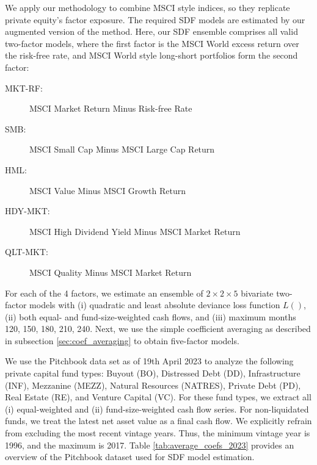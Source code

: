 \documentclass[12pt]{article}
\begin{document}
We apply our methodology to combine MSCI style indices, so they replicate private equity's factor exposure.
The required SDF models are estimated by our augmented version of the \cite{DLP12} method.
Here, our SDF ensemble comprises all valid two-factor models, where the first factor is the MSCI World excess return over the risk-free rate, and MSCI World style long-short portfolios form the second factor:
\begin{description}
	\item[MKT-RF:]{MSCI Market Return Minus Risk-free Rate}
	\item[SMB:]{MSCI Small Cap Minus MSCI Large Cap Return}
	\item[HML:]{MSCI Value Minus MSCI Growth Return}
	\item[HDY-MKT:]{MSCI High Dividend Yield Minus MSCI Market Return}
	\item[QLT-MKT:]{MSCI Quality Minus MSCI Market Return}
\end{description}
For each of the 4 factors, we estimate an ensemble of $2 \times 2 \times 5$ bivariate two-factor models with (i) quadratic and least absolute deviance loss function $L()$, (ii) both equal- and fund-size-weighted cash flows, and (iii) maximum months 120, 150, 180, 210, 240.
Next, we use the simple coefficient averaging as described in subsection \ref{sec:coef_averaging} to obtain five-factor models.

We use the Pitchbook data set as of 19th April 2023 to analyze the following private capital fund types: 
Buyout (BO), 
Distressed Debt (DD), 
Infrastructure (INF), 
Mezzanine (MEZZ),
Natural Resources (NATRES), 
Private Debt (PD), 
Real Estate (RE), 
and Venture Capital (VC).
For these fund types, we extract all (i) equal-weighted and (ii) fund-size-weighted cash flow series.
For non-liquidated funds, we treat the latest net asset value as a final cash flow.
We explicitly refrain from excluding the most recent vintage years.
Thus, the minimum vintage year is 1996, and the maximum is 2017.
Table \ref{tab:average_coefs_2023} provides an overview of the Pitchbook dataset used for SDF model estimation.
\end{document}
